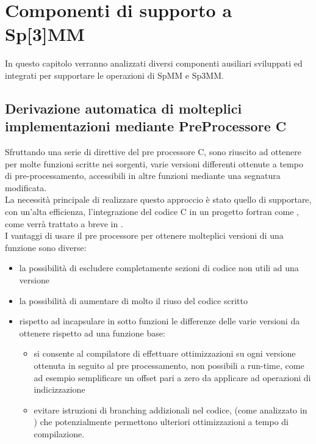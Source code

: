 \chapter{Componenti di supporto a Sp[3]MM}
In questo capitolo verranno analizzati diversi componenti ausiliari
sviluppati ed integrati per supportare le operazioni di SpMM e Sp3MM.\\
\section[Derivazione di molteplici implementazioni con PreProcessore C]	
{Derivazione automatica di molteplici implementazioni mediante PreProcessore C}	\label{chSpMMAux:multiImpl}
Sfruttando una serie di direttive del pre processore C, sono riuscito ad ottenere
per molte funzioni scritte nei sorgenti, varie versioni differenti ottenute a tempo di pre-processamento, 
accessibili in altre funzioni mediante una segnatura modificata.\\
La necessità principale di realizzare questo approccio è stato quello di supportare, con
un'alta efficienza, l'integrazione del codice C in un progetto fortran come \cite{PSBLAS3},
come verrà trattato a breve in .\\
I vantaggi di usare il pre processore per ottenere molteplici versioni di una funzione sono diverse:
\begin{itemize}
	\item	la possibilità di escludere completamente sezioni di codice non utili ad una versione
	\item	la possibilità di aumentare di molto il riuso del codice scritto
	\item	rispetto ad incapsulare in sotto funzioni le differenze delle varie versioni da ottenere
			rispetto ad una funzione  base:
	\begin{itemize}
		\item	si consente al compilatore di effettuare ottimizzazioni 
				su ogni versione ottenuta in seguito al pre processamento, non possibili a run-time,
				come ad esempio semplificare un offset pari a zero da applicare ad operazioni di indicizzazione
		\item	evitare istruzioni di branching addizionali nel codice, (come analizzato in  )
				che potenzialmente permettono ulteriori ottimizzazioni a tempo di compilazione.\\
	\end{itemize}
\end{itemize}
